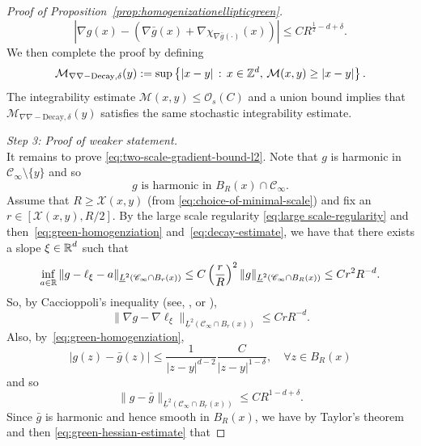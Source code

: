 \documentclass[12pt]{amsart}
\numberwithin{equation}{section}
\begin{document}
\begin{proof}[Proof of Proposition~\ref{prop:homogenizationellipticgreen}]
		\begin{equation*}
			| \nabla g(x) - (\nabla \bar{g}(x) + \nabla \chi_{\nabla \bar{g}(\cdot) }(x))| \leq C R^{\frac{1}{2}- d + \delta}.
		\end{equation*}
		We then complete the proof by defining 
		\begin{equation*}
			\mathcal{M}_{\nabla\nabla-\mathrm{Decay}, \delta}(y) := \sup \left\{ |x - y| \, : \, x \in \mathbb{Z}^d, \, \mathcal{M}(x , y) \geq |x - y| \right\}.
		\end{equation*}
		The integrability estimate $\mathcal{M}(x , y) \leq \mathcal{O}_s(C)$ and a union bound implies that $\mathcal{M}_{\nabla\nabla-\mathrm{Decay}, \delta}(y)$ satisfies the same stochastic integrability estimate.
		
		\medskip 
		{\it Step 3: Proof of weaker statement.} \\
		It remains to prove \eqref{eq:two-scale-gradient-bound-l2}.  Note that $g$ is harmonic in $\mathscr{C}_{\infty} \setminus \{y\}$
		and so
		\[
		\mbox{$g$ is harmonic in $B_R(x) \cap \mathscr{C}_{\infty}$}.
		\]
		Assume that $R \geq \mathcal{X}(x,y)$ (from \eqref{eq:choice-of-minimal-scale}) and fix an $r \in [\mathcal{X}(x,y), R/2]$. By the large scale regularity \eqref{eq:large scale-regularity} and then~\eqref{eq:green-homogenziation} and~\eqref{eq:decay-estimate}, we have that there exists a slope $\xi \in \operatorname{\mathbb{R}}^d$ such that
		\begin{equation} \label{eq:green-large scale-regularity}
			\inf_{a \in \operatorname{\mathbb{R}}} \| g - \ell_\xi - a \|_{\underline{L}^2(\mathscr{C}_{\infty} \cap B_r(x))} \leq C \left( \frac{r}{R} \right)^{2} \| g\|_{\underline{L}^2(\mathscr{C}_{\infty} \cap B_R(x))}
			\leq C r^2 R^{-d}.
		\end{equation}
		So, by Caccioppoli's inequality (see, \eg, \cite[Lemma 3.5]{armstrong-dario-2018} or \cite{delmotte-elliptic-estimates}), 
		\begin{equation} \label{eq:cacciopoli-apply}
			\| \nabla g - \nabla \ell_\xi  \|_{\underline{L}^2(\mathscr{C}_{\infty} \cap  B_r(x))} \leq C r R^{-d}.
		\end{equation}
		Also, by~\eqref{eq:green-homogenziation},
		\[
		|g(z) - \bar{g}(z)|  \leq \frac{1}{|z-y|^{d-2}} \frac{C}{|z-y|^{1-\delta}}, \quad \forall z \in B_R(x)
		\]
		and so 
		\begin{equation} \label{eq:homogenization-green-close}
			\| g - \bar{g} \|_{\underline{L}^2(\mathscr{C}_{\infty} \cap B_r(x))} \leq C R^{1 - d + \delta}.
		\end{equation}
		Since $\bar{g}$ is harmonic and hence smooth in $B_R(x)$, we have by Taylor's theorem and then \eqref{eq:green-hessian-estimate} that

\end{proof}
\end{document}
